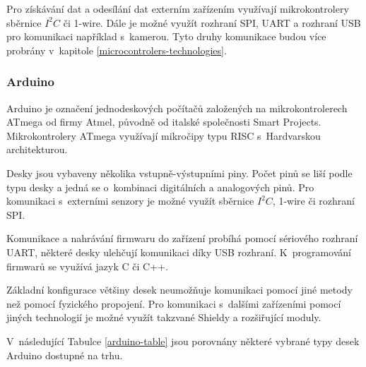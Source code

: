 Pro získávání dat a odesílání dat externím zařízením využívají mikrokontrolery sběrnice $I^2C$ či 1-wire. Dále je možné využít rozhraní SPI, UART a rozhraní USB pro komunikaci například s~kamerou. Tyto druhy komunikace budou více probrány v~kapitole \ref{microcontrolers-technologies}.

\subsubsection*{Arduino} \label{arduino-platform}
Arduino je označení jednodeskových počítačů založených na mikrokontrolerech ATmega od firmy Atmel, původně od italské společnosti Smart Projects. Mikrokontrolery ATmega využívají mikročipy typu RISC s~Hardvarskou architekturou.  

Desky jsou vybaveny několika vstupně-výstupními piny. Počet pinů se liší podle typu desky a jedná se o~kombinaci digitálních a analogových pinů. Pro komunikaci s~externími senzory je možné využít sběrnice $I^2C$, 1-wire či rozhraní SPI. 

Komunikace a nahrávání firmwaru do zařízení probíhá pomocí sériového rozhraní UART, některé desky ulehčují komunikaci díky USB rozhraní. K~programování firmwarů se využívá jazyk C či C++.

Základní konfigurace většiny desek neumožňuje komunikaci pomocí jiné metody než pomocí fyzického propojení. Pro komunikaci s~dalšími zařízeními pomocí jiných technologií je možné využít takzvané Shieldy a rozšiřující moduly.

V~následující Tabulce \ref{arduino-table} jsou porovnány některé vybrané typy desek Arduino dostupné na trhu.

